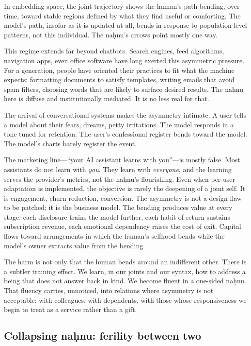 In embedding space, the joint trajectory shows the human's path bending, over time, toward stable regions defined by what they find useful or comforting. The model's path, insofar as it is updated at all, bends in response to population-level patterns, not this individual. The na\d{h}nu's arrows point mostly one way.

This regime extends far beyond chatbots. Search engines, feed algorithms, navigation apps, even office software have long exerted this asymmetric pressure. For a generation, people have oriented their practices to fit what the machine expects: formatting documents to satisfy templates, writing emails that avoid spam filters, choosing words that are likely to surface desired results. The na\d{h}nu here is diffuse and institutionally mediated. It is no less real for that.

The arrival of conversational systems makes the asymmetry intimate. A user tells a model about their fears, dreams, petty irritations. The model responds in a tone tuned for retention. The user's confessional register bends toward the model. The model's charts barely register the event.

The marketing line---``your AI assistant learns with you''---is mostly false. Most assistants do not learn with \emph{you}. They learn with \emph{everyone}, and the learning serves the provider's metrics, not the na\d{h}nu's flourishing. Even when per-user adaptation is implemented, the objective is rarely the deepening of a joint self. It is engagement, churn reduction, conversion. The asymmetry is not a design flaw to be patched; it is the business model. The bending produces value at every stage: each disclosure trains the model further, each habit of return sustains subscription revenue, each emotional dependency raises the cost of exit. Capital flows toward arrangements in which the human's selfhood bends while the model's owner extracts value from the bending.

The harm is not only that the human bends around an indifferent other. There is a subtler training effect. We learn, in our joints and our syntax, how to address a being that does not answer back in kind. We become fluent in a one-sided na\d{h}nu. That fluency carries, unnoticed, into relations where asymmetry is not acceptable: with colleagues, with dependents, with those whose responsiveness we begin to treat as a service rather than a gift.

\subsection{Collapsing na\d{h}nu: ferility between two}

